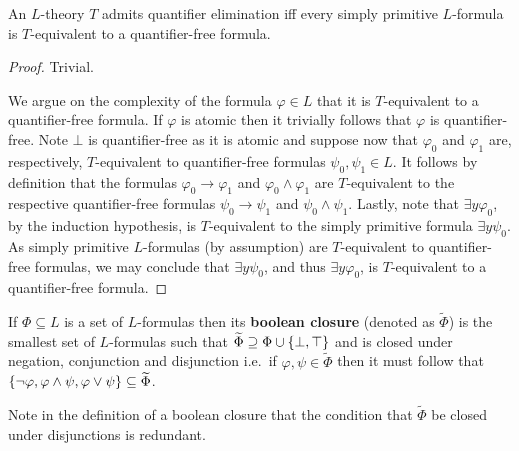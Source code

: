\begin{prp}\label{prp:sprm}
	An $L$-theory $T$ admits quantifier elimination iff every simply primitive $L$-formula is $T$-equivalent to a quantifier-free formula.
\end{prp}
\begin{proof}
	\forward Trivial.

	\backward We argue on the complexity of the formula $\varphi\in L$ that it is $T$-equivalent to a quantifier-free formula.  If $\varphi$ is atomic then it trivially follows that $\varphi$ is quantifier-free.  Note $\bot$ is quantifier-free as it is atomic and suppose now that $\varphi_0$ and $\varphi_1$ are, respectively, $T$-equivalent to quantifier-free formulas $\psi_0,\psi_1\in L$.  It follows  by definition that the formulas $\varphi_0\rightarrow\varphi_1$ and $\varphi_0\wedge\varphi_1$ are $T$-equivalent to the respective quantifier-free formulas $\psi_0\rightarrow\psi_1$ and $\psi_0\wedge\psi_1$.  Lastly, note that $\exists y\varphi_0$, by the induction hypothesis, is $T$-equivalent to the simply primitive formula $\exists y\psi_0$.  As simply primitive $L$-formulas (by assumption) are $T$-equivalent to quantifier-free formulas, we may conclude that $\exists y\psi_0$, and thus $\exists y\varphi_0$, is $T$-equivalent to a quantifier-free formula.
\end{proof}

\begin{dfn}
	If $\Phi\subseteq L$ is a set of $L$-formulas then its \textbf{boolean closure} (denoted as $\widetilde{\Phi}$) is the smallest set of $L$-formulas such that $\widetilde{\Phi}\supseteq\Phi\cup\left\lbrace \bot,\top\right\rbrace$ and is closed under negation, conjunction and disjunction i.e.\ if $\varphi,\psi\in\widetilde{\Phi}$ then it must follow that $\left\lbrace \neg\varphi, \varphi\wedge\psi,\varphi\vee\psi\right\rbrace\subseteq\widetilde{\Phi}$.
\end{dfn}

\begin{rem}
	Note in the definition of a boolean closure that the condition that $\widetilde{\Phi}$ be closed under disjunctions is redundant.
\end{rem}

